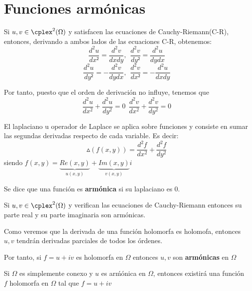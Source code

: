 \documentclass{apuntes}
\begin{document}
\section{Funciones armónicas}

Si $u,v\in \cplex^2(\Omega)$ y satisfacen las ecuaciones de Cauchy-Riemann(C-R), entonces, derivando a ambos lados de las ecuaciones C-R, obtenemos:
\[\frac{d^2u}{dx²}=\frac{d^2v}{dxdy}, \ \ \frac{d^2v}{dy²}=\frac{d^2u}{dydx}\]
\[\frac{d^2u}{dy²}=-\frac{d^2v}{dydx}, \ \ \frac{d^2v}{dx²}=-\frac{d^2u}{dxdy}\]

Por tanto, puesto que el orden de derivación no influye, tenemos que
\[\frac{d^2u}{dx^2}+\frac{d^2u}{dy^2} = 0 \ \ \frac{d^2v}{dx^2}+\frac{d^2v}{dy^2} = 0\]

\begin{defn}[Laplaciano]
El laplaciano u operador de Laplace se aplica sobre funciones y consiste en sumar las segundas derivadas respecto de cada variable. Es decir:
\[\vartriangle (f(x,y)) = \frac{d^2f}{dx^2}+\frac{d^2f}{dy^2}\]
siendo $f(x,y)=\underbrace{Re(x,y)}_{u(x,y)}+\underbrace{Im(x,y)}_{v(x,y)}i$
\end{defn}

\begin{defn}
Se dice que una función es \textbf{armónica} si su laplaciano es 0.
\end{defn}

\begin{prop}
Si $u,v \in \cplex^2(\Omega)$ y verifican las ecuaciones de Cauchy-Riemann entonces su parte real y su parte imaginaria son armónicas.
\end{prop}

Como veremos que la derivada de una función holomorfa es holomofa, entonces $u,v$ tendrán derivadas parciales de todos los órdenes.

Por tanto, si $f=u+iv$ es holomorfa en $\Omega$ entonces $u,v$ son \textbf{armónicas} en $\Omega$

\obs Si $\Omega$ es simplemente conexo y $u$ es arḿónica en $\Omega$, entonces existirá una función $f$ holomorfa en $\Omega$ tal que $f=u+iv$
\end{document}
